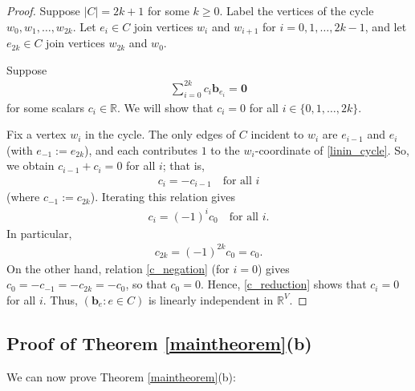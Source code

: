 \documentclass[12pt]{article}
\theoremstyle{definition}
\theoremstyle{remark}
\newcommand{\tup}[1]{\left( #1 \right)}
\begin{document}
\begin{proof}
    Suppose $|C|=2k+1$ for some $k \geq 0$. Label the vertices of the cycle $w_0,w_1,\ldots,w_{2k}$. Let $e_i \in C$ join vertices $w_{i}$ and $w_{i+1}$ for $i=0,1,\ldots,2k-1$,  and let $e_{2k} \in C$ join vertices $w_{2k}$ and $w_0$.

   Suppose \begin{align}\label{linin_cycle}
       \sum_{i=0}^{2k}c_i\mathbf{b}_{e_{i}} = \mathbf{0}
   \end{align} for some scalars $c_i \in \mathbb{R}$. We will show that $c_i = 0$ for all $i \in \{0,1,\ldots,2k\}$.

   Fix a vertex $w_i$ in the cycle. The only edges of $C$ incident to $w_i$ are $e_{i-1}$ and $e_i$ (with $e_{-1} := e_{2k}$), and each contributes $1$ to the $w_i$-coordinate of \eqref{linin_cycle}. So, we obtain $c_{i-1}+c_i=0$ for all $i$; that is, \begin{align}\label{c_negation}
       c_{i} = -c_{i-1} \quad \text{for all } i
   \end{align} (where $c_{-1} := c_{2k}$).
   Iterating this relation gives \begin{align}
       \label{c_reduction}
       c_i = (-1)^i c_0 \quad \text{for all } i.
   \end{align} In particular, \begin{align*}
       c_{2k} = (-1)^{2k}c_0 = c_0.
   \end{align*}
   On the other hand, relation \eqref{c_negation} (for $i = 0$) gives $c_0 = - c_{-1} = - c_{2k} = - c_0$, so that $c_0 = 0$. Hence, \eqref{c_reduction} shows that $c_i = 0$ for all $i$. Thus, $\tup{\mathbf{b}_e : e \in C}$ is linearly independent in $\mathbb{R}^V$.
\end{proof}

\subsection{Proof of Theorem \ref{maintheorem}(b)}

We can now prove Theorem \ref{maintheorem}(b):
\end{document}

